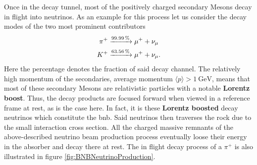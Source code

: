 Once in the decay tunnel, most of the positively charged secondary \glspl{Meson} decay in flight \ia into neutrinos. As an example for this process let us consider the decay modes of the two most prominent contributors \cite{PDG2018}
\begin{align}
    \ce{$\pi^{+}$ &->[\SI{99.99}{\percent}] $\mu^{+}$ +  $\nu_{\mu}$} \\
    \ce{$K^{+}$ &->[\SI{63.56}{\percent}] $\mu^{+}$ +  $\nu_{\mu}$}. \nonumber
\end{align}
Here the percentage denotes the fraction of said decay channel. The relatively high momentum of the secondaries, \ie average momentum $\langle p \rangle > \SI{1}{\giga\electronvolt}$, means that most of these secondary \glspl{Meson} are relativistic particles with a notable \textbf{Lorentz boost}. Thus, the decay products are focused forward when viewed in a reference frame at rest, as is the case here. In fact, it is these \textbf{Lorentz boosted} decay neutrinos which constitute the \gls{bnb}. Said neutrinos then traverses the rock due to the small interaction cross section. All the charged massive remnants of the above-described neutrino beam production process eventually loose their energy in the absorber and decay there at rest. The in flight decay process of a $\pi^+$ is also illustrated in figure \ref{fig:BNBNeutrinoProduction}.

